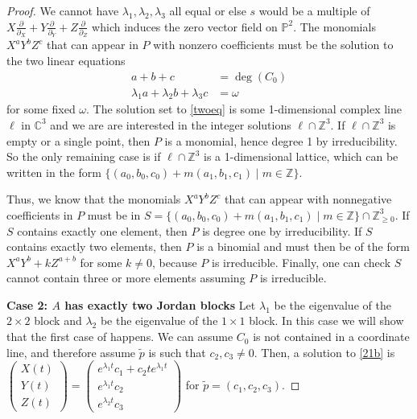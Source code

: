 \documentclass[11pt,reqno]{amsart}
\theoremstyle{plain}
\theoremstyle{definition}
\theoremstyle{remark}
\numberwithin{equation}{section}
\numberwithin{equation}{section}
\newcommand{\PP}{\mathbb{P}}
\begin{document}
\begin{proof}
We cannot have $\lambda_1,\lambda_2,\lambda_3$ all equal or else $s$ would be a multiple of $X\frac{\partial}{\partial_X}+Y\frac{\partial}{\partial_Y}+Z\frac{\partial}{\partial_Z}$ which induces the zero vector field on $\PP^2$. The monomials $X^{a}Y^{b}Z^{c}$ that can appear in $P$ with nonzero coefficients must be the solution to the two linear equations
\begin{align}
\label{twoeq}
    a+b+c&=\deg(C_0)\\
    \lambda_1a + \lambda_2 b+\lambda_3 c &= \omega
\end{align}
for some fixed $\omega$. The solution set to \eqref{twoeq} is some 1-dimensional complex line $\ell$ in $\mathbb{C}^3$ and we are are interested in the integer solutions $\ell\cap \mathbb{Z}^3$. If $\ell\cap \mathbb{Z}^3$ is empty or a single point, then $P$ is a monomial, hence degree 1 by irreducibility. So the only remaining case is if $\ell\cap \mathbb{Z}^3$ is a 1-dimensional lattice, which can be written in the form $\{(a_0,b_0,c_0)+m(a_1,b_1,c_1)\mid m\in \mathbb{Z}\}$.

Thus, we know that the monomials $X^{a}Y^b Z^c$ that can appear with nonnegative coefficients in $P$ must be in $S=\{(a_0,b_0,c_0)+m(a_1,b_1,c_1)\mid m\in \mathbb{Z}\}\cap \mathbb{Z}_{\geq 0}^3$. If $S$ contains exactly one element, then $P$ is degree one by irreducibility. If $S$ contains exactly two elements, then $P$ is a binomial and must then be of the form $X^aY^b+kZ^{a+b}$ for some $k\neq 0$, because $P$ is irreducible. Finally, one can check $S$ cannot contain three or more elements assuming $P$ is irreducible.

\textbf{Case 2: $A$ has exactly two Jordan blocks} Let $\lambda_1$ be the eigenvalue of the $2\times 2$ block and $\lambda_2$ be the eigenvalue of the $1\times 1$ block. In this case we will show that the first case of  happens. We can assume $C_0$ is not contained in a coordinate line, and therefore assume $\widetilde{p}$ is such that $c_2,c_3\neq 0$.  Then, a solution to \eqref{21b} is $\begin{pmatrix} X(t) \\ Y(t) \\ Z(t)\end{pmatrix}=\begin{pmatrix} e^{\lambda_1 t} c_1 + c_2 te^{\lambda_1 t} \\ e^{\lambda_1 t} c_2 \\ e^{\lambda_2 t} c_3\end{pmatrix}$ for $\widetilde{p}=(c_1,c_2,c_3)$.


\end{proof}
\end{document}
